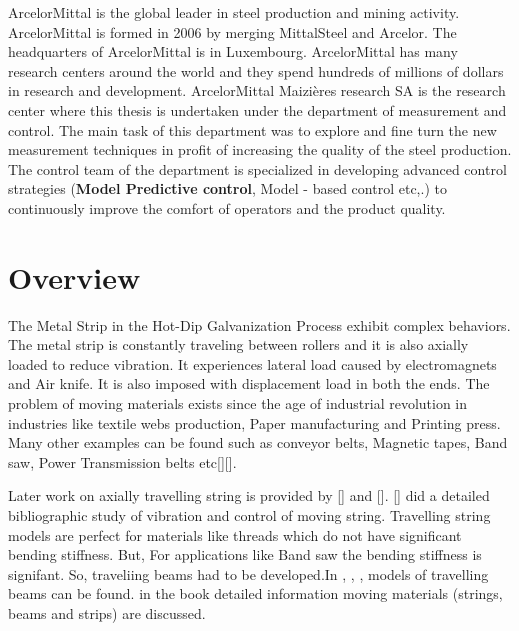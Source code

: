 \documentclass[main.tex]{subfiles}
\begin{document}
ArcelorMittal is the global leader in steel production and mining activity. ArcelorMittal is formed in 2006 by merging MittalSteel and Arcelor. The headquarters of ArcelorMittal is in Luxembourg. ArcelorMittal has many research centers around the world and they spend hundreds of millions of dollars in research and development. ArcelorMittal Maizières research SA is the research center where this thesis is undertaken under the department of measurement and control. The main task of this department was to explore and fine turn the new measurement techniques in profit of increasing the quality of the steel production. The control team of the department is specialized in developing advanced control strategies (\textbf{Model Predictive control}, Model - based control etc,.) to continuously improve the comfort of operators and the product quality.




\section{Overview}

The Metal Strip in the Hot-Dip Galvanization Process exhibit complex behaviors. The metal strip is constantly traveling between rollers and it is also axially loaded to reduce vibration. It experiences lateral load caused by electromagnets and Air knife. It is also imposed with displacement load in both the ends. The problem of moving materials exists since the age of industrial revolution in industries like textile webs production, Paper manufacturing and Printing press. Many other examples can be found such as conveyor belts, Magnetic tapes, Band saw, Power Transmission belts etc[\cite{CHOI20021}][\cite{Moving_sandwich}].

Later work on axially travelling string is provided by [\cite{STEINBOECK2015598}] and [\cite{KOIVUROVA1999845}]. [\cite{string_biblio}] did a detailed bibliographic study of vibration and control of moving string. Travelling string models are perfect for materials like threads which do not have significant bending stiffness. But, For applications like Band saw the bending stiffness is signifant. So, traveliing beams had to be developed.In \cite{CHEN2006996}, \cite{CHANG20101482}, \cite{Moving_beam}, \cite{Moving_TIM_Beam} models of travelling beams can be found. \cite{BookDynmicMarynowiski2008} in the book detailed information moving materials (strings, beams and strips) are discussed. 
\end{document}

